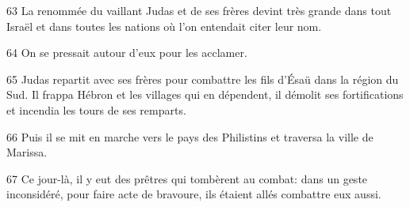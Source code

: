 
63 La renommée du vaillant Judas et de ses frères devint très grande dans tout Israël et dans toutes les nations où l’on entendait citer leur nom.

64 On se pressait autour d’eux pour les acclamer.

65 Judas repartit avec ses frères pour combattre les fils d’Ésaü dans la région du Sud. Il frappa Hébron et les villages qui en dépendent, il démolit ses fortifications et incendia les tours de ses remparts.

66 Puis il se mit en marche vers le pays des Philistins et traversa la ville de Marissa.

67 Ce jour-là, il y eut des prêtres qui tombèrent au combat: dans un geste inconsidéré, pour faire acte de bravoure, ils étaient allés combattre eux aussi.